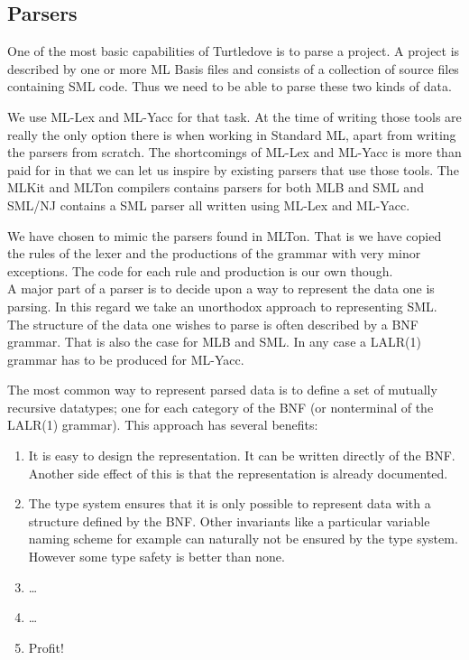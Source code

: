 \subsection{Parsers}
\label{sec:design-parsers}

One of the most basic capabilities of Turtledove is to parse a project. A
project is described by one or more ML Basis files and consists of a collection
of source files containing SML code. Thus we need to be able to parse these two
kinds of data.

We use ML-Lex and ML-Yacc for that task. At the time of writing those tools are
really the only option there is when working in Standard ML, apart from writing
the parsers from scratch. The shortcomings of ML-Lex and ML-Yacc is more than
paid for in that we can let us inspire by existing parsers that use those
tools. The MLKit and MLTon compilers contains parsers for both MLB and SML and
SML/NJ contains a SML parser all written using ML-Lex and ML-Yacc.

We have chosen to mimic the parsers found in MLTon. That is we have copied the
rules of the lexer and the productions of the grammar with very minor
exceptions. The code for each rule and production is our own though.
\\[1em]

A major part of a parser is to decide upon a way to represent the data one is
parsing. In this regard we take an unorthodox approach to representing SML.
\\[1em]

The structure of the data one wishes to parse is often described by a BNF
grammar. That is also the case for MLB and SML. In any case a LALR(1) grammar
has to be produced for ML-Yacc.

The most common way to represent parsed data is to define a set of mutually
recursive datatypes; one for each category of the BNF (or nonterminal of the
LALR(1) grammar). This approach has several benefits:

\begin{enumerate}
\item It is easy to design the representation. It can be written directly of the
      BNF. Another side effect of this is that the representation is already
      documented.
\item The type system ensures that it is only possible to represent data with a
      structure defined by the BNF. Other invariants like a particular variable
      naming scheme for example can naturally not be ensured by the type
      system. However some type safety is better than none.
\item \ldots
\item \ldots
\item Profit!
\end{enumerate}

